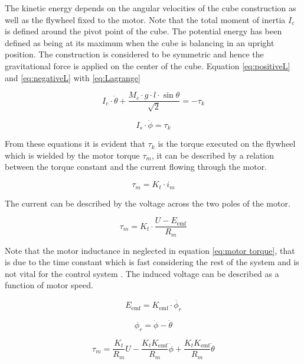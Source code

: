 \documentclass[a4paper,11pt]{kth-mag}
\begin{document}
The kinetic energy depends on the angular velocities of the cube construction as well as the flywheel fixed to the motor. Note that the total moment of inertia $I_c$ is defined around the pivot point of the cube. The potential energy has been defined as being at its maximum when the cube is balancing in an upright position. The construction is considered to be symmetric and hence the gravitational force is applied on the center of the cube.
Equation \eqref{eq:positiveL} and \eqref{eq:negativeL} with \eqref{eq:Lagrange}

\begin{equation} \label{eq:negativeL2}
I_c \cdot \ddot{\theta} + \frac{M_c \cdot g \cdot l \cdot \sin \theta }{\sqrt{2}}  = -\tau_k
\end{equation}

\begin{equation} \label{eq:postiveL2}
I_s \cdot \ddot{\phi} = \tau_k
\end{equation}

From these equations it is evident that $\tau_k$ is the torque executed on the flywheel which is wielded by the motor torque $\tau_m$, it can be described by a relation between the torque constant and the current flowing through the motor.

\begin{equation}
\tau_m = K_t \cdot i_m
\end{equation}

The current can be described by the voltage across the two poles of the motor.

\begin{equation} \label{eq:motor torque}
\tau_m = K_t \cdot \frac{U-E_{\text{emf}} }{R_m}
\end{equation}

Note that the motor inductance in neglected in equation \eqref{eq:motor torque}, that is due to the time constant which is fast considering the rest of the system and is not vital for the control system \cite{KTHpendulum}.
The induced voltage can be described as a function of motor speed.

\begin{equation}
E_{\text{emf}} = K_{\text{emf}} \cdot \dot{\phi_r}
\end{equation}

\begin{equation}
\phi_r = \dot{\phi} - \dot{\theta}
\end{equation}
 
\begin{equation} \label{eq:tau}
\tau_m = \frac{K_t}{R_m} U - \frac{K_t K_{\text{emf}} }{R_m} \dot{\phi} + \frac{K_t K_{\text{emf}} }{R_m} \dot{\theta}
\end{equation}
\end{document}
